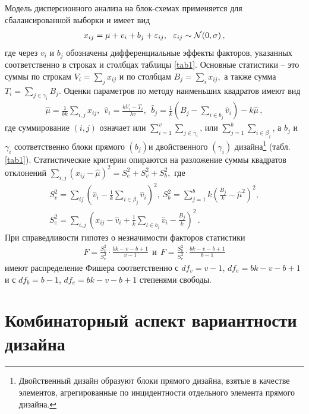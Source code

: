 \documentclass{math-mech-sci}
\newcommand{\bea}{\begin{eqnarray*}}
\newcommand{\eea}{\end{eqnarray*}}
\begin{document}
Модель дисперсионного анализа на блок-схемах применяется для сбалансированной выборки и имеет вид 
\bea
x_{ij}=\mu+v_i+b_j+\varepsilon_{ij},~~\varepsilon_{ij}\sim {\cal N}(0,\sigma)\,,
\eea
где через $v_i$ и $ b_j$ обозначены дифференциальные эффекты факторов, указанных соответственно в строках и столбцах таблицы  \ref{tab1}. 
Основные статистики -- это суммы по строкам 
$
V_i=\sum\limits_{j}x_{ij}
$
и по столбцам
$
B_j=\sum\limits_{i}x_{ij},
$ а также сумма $T_i=\sum\limits_{j\in \gamma_i }B_j$.  
Оценки параметров по методу наименьших квадратов  \cite{bib:duge1972} имеют вид
\bea 
\hat{\mu}=\frac{1}{bk}\sum\limits_{i,j} x_{ij},~~
%
\hat  v_i=\frac{kV_i-T_i}{\lambda v},~~
%
\hat {b}_j=\frac 1 k (B_j-\sum\limits_{i\in b_j} \hat v_i )-k\hat \mu\,,
\eea
где суммирование $(i,j)$  означает или $\sum\limits_{i=1}^v\sum\limits_{j\in \gamma_i}$, или 
$\sum\limits_{j=1}^b\sum\limits_{i\in \beta_j}$, а $b_j$ и  $\gamma_i$ соответственно блоки прямого $(b_j)$и двойственного $(\gamma_i)$  дизайна\footnote{Двойственный дизайн образуют блоки прямого дизайна, взятые в качестве элементов, агрегированные по инцидентности отдельного элемента прямого дизайна.} (табл.\ref{tab1}).
%
Статистические критерии опираются на разложение суммы квадратов отклонений $ \sum\limits_{i,j}(x_{ij}-\hat{\mu})^2=S^2_e+S^2_v+S^2_b,$ где
\bea
%
S_v^2=\sum\limits_{ij}\left(\hat v_i-\frac{1}{k}\sum\limits_{i\in \beta_j}\hat v_i\right)^2,~
S_b^2=\sum\limits_{j=1}^b k\left( \frac{B_j}{k}-\hat{\mu}^2\right)^2, \\
S_e^2=\sum\limits_{i,j}\left(x_{ij} - \hat v_i +\frac 1 k \sum\limits_{l\in b_j}\hat v_i -\frac{B_j}k\right)^2\,.
\eea
При справедливости  гипотез о незначимости факторов статистики
\bea
F=\frac{S_v^2}{S_e^2}\cdot \frac{bk-v-b+1}{v-1}~~\mbox{и} ~~F=\frac{S_b^2}{S_e^2}\cdot \frac{bk-v-b+1}{b-1}
\eea
имеют распределение Фишера соответственно с $df_v=v-1$, $df_e=bk-v-b+1$ и с $df_b=b-1$, $df_e=bk-v-b+1$ степенями свободы.
\section{Комбинаторный аспект вариантности дизайна}
\end{document}

